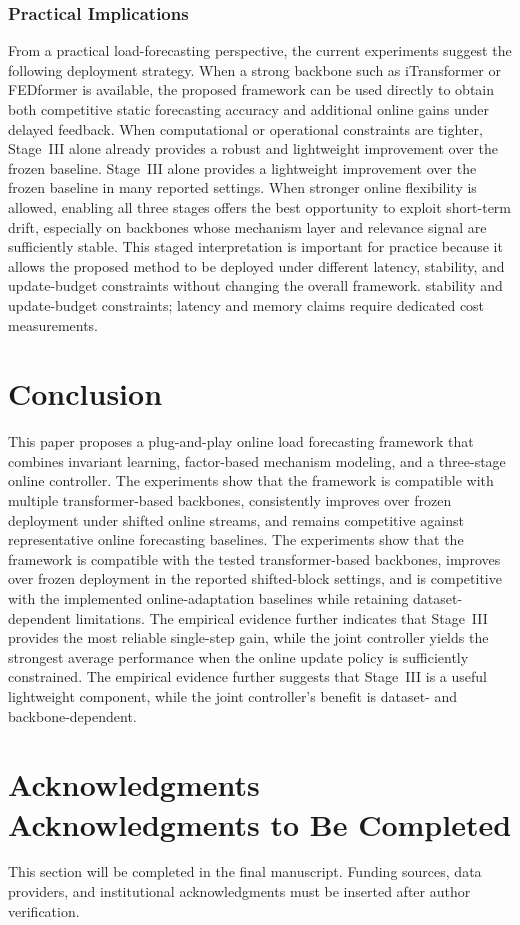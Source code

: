 ﻿\documentclass[journal]{IEEEtran}
\DeclareRobustCommand{\oldtext}[1]{{\color{revisionred}#1}}
\DeclareRobustCommand{\newtext}[1]{{\color{revisionblue}#1}}
\DeclareRobustCommand{\why}[1]{{\color{revisionblue}{\footnotesize (#1)}}}
\DeclareRobustCommand{\rw}[3]{\oldtext{#1} \newtext{#2}\why{#3}}
\begin{document}
\subsubsection{Practical Implications}
From a practical load-forecasting perspective, the current experiments suggest the following deployment strategy. When a strong backbone such as iTransformer or FEDformer is available, the proposed framework can be used directly to obtain both competitive static forecasting accuracy and additional online gains under delayed feedback. When computational or operational constraints are tighter, \rw{Stage~III alone already provides a robust and lightweight improvement over the frozen baseline.}{Stage~III alone provides a lightweight improvement over the frozen baseline in many reported settings.}{删除 robust，并限定范围。} When stronger online flexibility is allowed, enabling all three stages offers the best opportunity to exploit short-term drift, especially on backbones whose mechanism layer and relevance signal are sufficiently stable. This staged interpretation is important for practice because it allows the proposed method to be deployed under different \rw{latency, stability, and update-budget constraints without changing the overall framework.}{stability and update-budget constraints; latency and memory claims require dedicated cost measurements.}{未测延迟和内存，不能作为已验证结论。}

\FloatBarrier
\balance
\section{Conclusion}
This paper proposes a plug-and-play online load forecasting framework that combines invariant learning, factor-based mechanism modeling, and a three-stage online controller. \rw{The experiments show that the framework is compatible with multiple transformer-based backbones, consistently improves over frozen deployment under shifted online streams, and remains competitive against representative online forecasting baselines.}{The experiments show that the framework is compatible with the tested transformer-based backbones, improves over frozen deployment in the reported shifted-block settings, and is competitive with the implemented online-adaptation baselines while retaining dataset-dependent limitations.}{结论与审计证据一致，删除普遍优越性。} \rw{The empirical evidence further indicates that Stage~III provides the most reliable single-step gain, while the joint controller yields the strongest average performance when the online update policy is sufficiently constrained.}{The empirical evidence further suggests that Stage~III is a useful lightweight component, while the joint controller's benefit is dataset- and backbone-dependent.}{修正 all-backbone 和 stage-combination 结论过强问题。}

\section*{\rw{Acknowledgments}{Acknowledgments to Be Completed}{占位标题改为待完成状态，避免误认为最终稿。}}
\rw{This section will be completed in the final manuscript.}{Funding sources, data providers, and institutional acknowledgments must be inserted after author verification.}{保留待作者确认的信息，不编造资助或贡献。}
\end{document}

